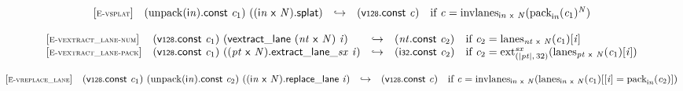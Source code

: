 \vspace{1ex}

$$
\begin{array}{@{}l@{}lcl@{}l@{}}
{[\textsc{\scriptsize E{-}vsplat}]} \quad & ({\mathrm{unpack}}({\mathsf{i}}{{\mathit{n}}}).\mathsf{const}~{\mathit{c}}_{{1}})~(({\mathsf{i}}{{\mathit{n}}}~\mathsf{x}~{\mathit{N}}).\mathsf{splat}) &\hookrightarrow& (\mathsf{v{\scriptstyle128}}.\mathsf{const}~{\mathit{c}}) &\quad
  \mbox{if}~{\mathit{c}} = {{\mathrm{invlanes}}}_{{\mathsf{i}}{{\mathit{n}}}~\mathsf{x}~{\mathit{N}}}({{{\mathrm{pack}}}_{{\mathsf{i}}{{\mathit{n}}}}({\mathit{c}}_{{1}})^{{\mathit{N}}}}) \\
\end{array}
$$

\vspace{1ex}

$$
\begin{array}{@{}l@{}lcl@{}l@{}}
{[\textsc{\scriptsize E{-}vextract\_lane{-}num}]} \quad & (\mathsf{v{\scriptstyle128}}.\mathsf{const}~{\mathit{c}}_{{1}})~(\mathsf{vextract\_lane}~({\mathit{nt}}~\mathsf{x}~{\mathit{N}})~{\mathit{i}}) &\hookrightarrow& ({\mathit{nt}}.\mathsf{const}~{\mathit{c}}_{{2}}) &\quad
  \mbox{if}~{\mathit{c}}_{{2}} = {{\mathrm{lanes}}}_{{\mathit{nt}}~\mathsf{x}~{\mathit{N}}}({\mathit{c}}_{{1}}){}[{\mathit{i}}] \\
{[\textsc{\scriptsize E{-}vextract\_lane{-}pack}]} \quad & (\mathsf{v{\scriptstyle128}}.\mathsf{const}~{\mathit{c}}_{{1}})~({({\mathit{pt}}~\mathsf{x}~{\mathit{N}}).\mathsf{extract\_lane\_}}{{\mathit{sx}}}~{\mathit{i}}) &\hookrightarrow& (\mathsf{i{\scriptstyle32}}.\mathsf{const}~{\mathit{c}}_{{2}}) &\quad
  \mbox{if}~{\mathit{c}}_{{2}} = {{{{\mathrm{ext}}}_{({|{\mathit{pt}}|},\, 32)}^{{\mathit{sx}}}}}{({{\mathrm{lanes}}}_{{\mathit{pt}}~\mathsf{x}~{\mathit{N}}}({\mathit{c}}_{{1}}){}[{\mathit{i}}])} \\
\end{array}
$$

\vspace{1ex}

$$
\begin{array}{@{}l@{}lcl@{}l@{}}
{[\textsc{\scriptsize E{-}vreplace\_lane}]} \quad & (\mathsf{v{\scriptstyle128}}.\mathsf{const}~{\mathit{c}}_{{1}})~({\mathrm{unpack}}({\mathsf{i}}{{\mathit{n}}}).\mathsf{const}~{\mathit{c}}_{{2}})~(({\mathsf{i}}{{\mathit{n}}}~\mathsf{x}~{\mathit{N}}).\mathsf{replace\_lane}~{\mathit{i}}) &\hookrightarrow& (\mathsf{v{\scriptstyle128}}.\mathsf{const}~{\mathit{c}}) &\quad
  \mbox{if}~{\mathit{c}} = {{\mathrm{invlanes}}}_{{\mathsf{i}}{{\mathit{n}}}~\mathsf{x}~{\mathit{N}}}({{\mathrm{lanes}}}_{{\mathsf{i}}{{\mathit{n}}}~\mathsf{x}~{\mathit{N}}}({\mathit{c}}_{{1}}){}[{}[{\mathit{i}}] = {{\mathrm{pack}}}_{{\mathsf{i}}{{\mathit{n}}}}({\mathit{c}}_{{2}})]) \\
\end{array}
$$

